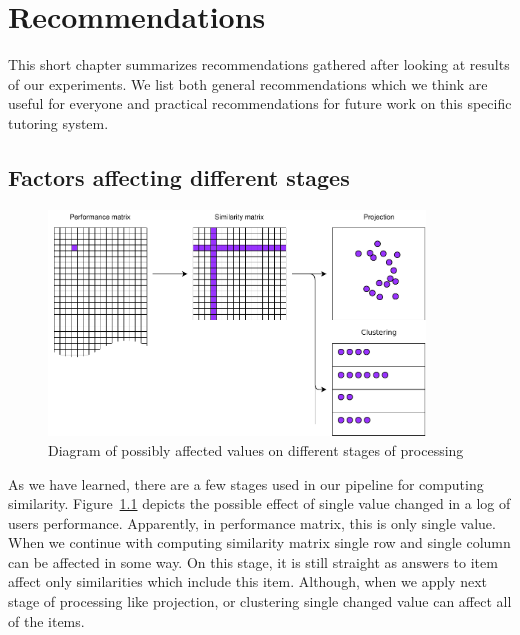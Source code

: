 \documentclass[
  printed, %
  table,   %
  nolof,     %
  nolot,     %
  color,
  final,
  nocover
]{fithesis3}
\begin{document}

\chapter{Recommendations}\label{recommendations}


This short chapter summarizes recommendations gathered after looking at results of our experiments. We list both general recommendations which we think are useful for everyone and practical recommendations for future work on this specific tutoring system.


\section{Factors affecting different stages}\label{factors-affecting-different-stages}

\begin{figure}
  \includegraphics[width=10cm]{img/affected_diagram}
  \caption{Diagram of possibly affected values on different stages of processing}
  \label{fig:affected_diagram}
\end{figure}


As we have learned, there are a few stages used in our pipeline for computing similarity. Figure~\ref{fig:affected_diagram} depicts the possible effect of single value changed in a log of users performance. Apparently, in performance matrix, this is only single value. When we continue with computing similarity matrix single row and single column can be affected in some way. On this stage, it is still straight as answers to item affect only similarities which include this item. Although, when we apply next stage of processing like projection, or clustering single changed value can affect all of the items.
\end{document}
